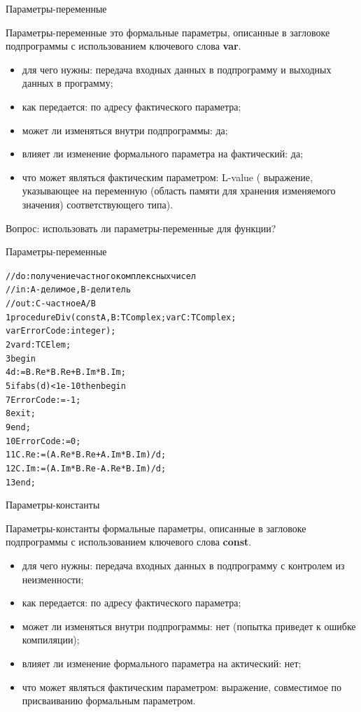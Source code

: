 \documentclass{beamer}
\begin{document}
\begin{frame}[fragile]{Параметры-переменные}
\begin{block}{Параметры-переменные}
это формальные параметры, описанные в загловоке подпрограммы с использованием ключевого слова \textbf{var}.
\end{block}
\begin{itemize}
\item для чего нужны: передача входных данных в подпрограмму и выходных данных в программу;
\item как передается: по адресу фактического параметра;
\item может ли изменяться внутри подпрограммы: да;
\item влияет ли изменение формального параметра на фактический: да;
\item что может являться фактическим параметром: L-value ( выражение, указывающее на переменную (область памяти для хранения изменяемого значения) соответствующего типа).
\end{itemize}
Вопрос: использовать ли параметры-переменные для функции?
\end{frame}

\begin{frame}[fragile]{Параметры-переменные}
\begin{alltt}
//do: получение частного комплексных чисел
//in: A - делимое, B - делитель
//out: С - частное A / B
1 procedure Div(const A, B: TComplex; var C: TComplex; 
    var ErrorCode: integer);
2  var d: TCElem;
3  begin
4    d := B.Re * B.Re + B.Im * B.Im;
5    if abs(d) < 1e-10 then begin
7      ErrorCode := -1;
8      exit;
9    end;
10   ErrorCode := 0;
11   C.Re := (A.Re * B.Re + A.Im * B.Im) / d;
12   C.Im := (A.Im * B.Re - A.Re * B.Im) / d;
13 end;	
\end{alltt}
\end{frame}

\begin{frame}[fragile]{Параметры-константы}
\begin{block}{Параметры-константы}
формальные параметры, описанные в загловоке подпрограммы с использованием ключевого слова \textbf{const}.
\end{block}
\begin{itemize}
\item для чего нужны: передача входных данных в подпрограмму с контролем из неизменности;
\item как передается: по адресу фактического параметра;
\item может ли изменяться внутри подпрограммы: нет (попытка приведет к ошибке компиляции);
\item влияет ли изменение формального параметра на актический: нет;
\item что может являться фактическим параметром: выражение, совместимое по присваиванию формальным параметром.
\end{itemize}
\end{frame}
\end{document}
